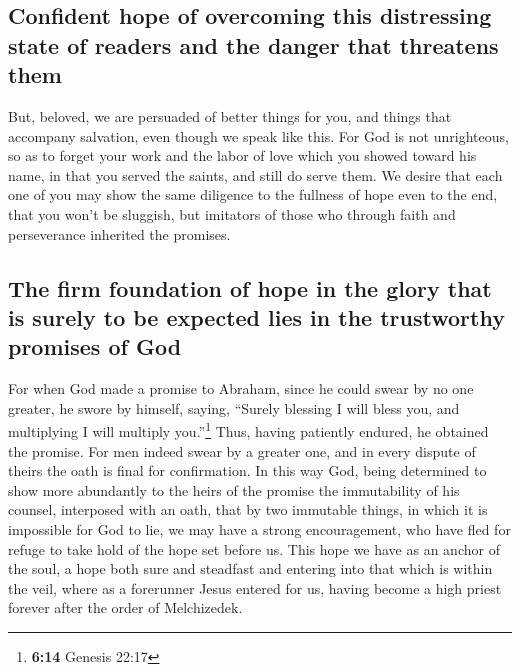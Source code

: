\hypertarget{confident-hope-of-overcoming-this-distressing-state-of-readers-and-the-danger-that-threatens-them}{%
\subsection{Confident hope of overcoming this distressing state of
readers and the danger that threatens
them}\label{confident-hope-of-overcoming-this-distressing-state-of-readers-and-the-danger-that-threatens-them}}

 But, beloved, we are persuaded of better things for you,
and things that accompany salvation, even though we speak like this.
 For God is not unrighteous, so as to forget your work
and the labor of love which you showed toward his name, in that you
served the saints, and still do serve them.  We desire
that each one of you may show the same diligence to the fullness of hope
even to the end,  that you won't be sluggish, but
imitators of those who through faith and perseverance inherited the
promises.

\hypertarget{the-firm-foundation-of-hope-in-the-glory-that-is-surely-to-be-expected-lies-in-the-trustworthy-promises-of-god}{%
\subsection{The firm foundation of hope in the glory that is surely to
be expected lies in the trustworthy promises of
God}\label{the-firm-foundation-of-hope-in-the-glory-that-is-surely-to-be-expected-lies-in-the-trustworthy-promises-of-god}}

 For when God made a promise to Abraham, since he could
swear by no one greater, he swore by himself,  saying,
``Surely blessing I will bless you, and multiplying I will multiply
you.''\footnote{\textbf{6:14} Genesis 22:17}  Thus,
having patiently endured, he obtained the promise.  For
men indeed swear by a greater one, and in every dispute of theirs the
oath is final for confirmation.  In this way God, being
determined to show more abundantly to the heirs of the promise the
immutability of his counsel, interposed with an oath, 
that by two immutable things, in which it is impossible for God to lie,
we may have a strong encouragement, who have fled for refuge to take
hold of the hope set before us.  This hope we have as an
anchor of the soul, a hope both sure and steadfast and entering into
that which is within the veil,  where as a forerunner
Jesus entered for us, having become a high priest forever after the
order of Melchizedek.

